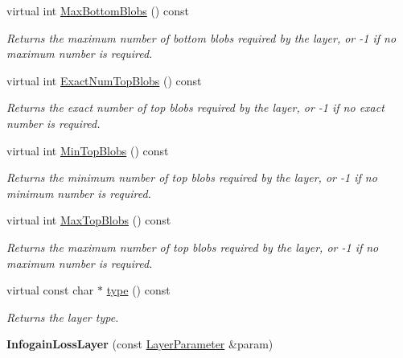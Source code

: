 \begin{DoxyCompactItemize}
virtual int \mbox{\hyperlink{classcaffe_1_1_infogain_loss_layer_a9b2372959a16da1e80ae7a98b7689a4c}{Max\+Bottom\+Blobs}} () const
\begin{DoxyCompactList}\small\item\em Returns the maximum number of bottom blobs required by the layer, or -\/1 if no maximum number is required. \end{DoxyCompactList}\item 
virtual int \mbox{\hyperlink{classcaffe_1_1_infogain_loss_layer_aaf55e75f2296586b1fee0175e2d72fbb}{Exact\+Num\+Top\+Blobs}} () const
\begin{DoxyCompactList}\small\item\em Returns the exact number of top blobs required by the layer, or -\/1 if no exact number is required. \end{DoxyCompactList}\item 
virtual int \mbox{\hyperlink{classcaffe_1_1_infogain_loss_layer_a15c4916e5de27151eb745491d8d14d41}{Min\+Top\+Blobs}} () const
\begin{DoxyCompactList}\small\item\em Returns the minimum number of top blobs required by the layer, or -\/1 if no minimum number is required. \end{DoxyCompactList}\item 
virtual int \mbox{\hyperlink{classcaffe_1_1_infogain_loss_layer_a93019601c6256354fd4758da91d9311f}{Max\+Top\+Blobs}} () const
\begin{DoxyCompactList}\small\item\em Returns the maximum number of top blobs required by the layer, or -\/1 if no maximum number is required. \end{DoxyCompactList}\item 
\mbox{\label{classcaffe_1_1_infogain_loss_layer_aada26ffd60207582fe2af602004e271b}} 
virtual const char $\ast$ \mbox{\hyperlink{classcaffe_1_1_infogain_loss_layer_aada26ffd60207582fe2af602004e271b}{type}} () const
\begin{DoxyCompactList}\small\item\em Returns the layer type. \end{DoxyCompactList}\item 
\mbox{\label{classcaffe_1_1_infogain_loss_layer_ac2269ba8dc7d18fa8fab90ea9f295784}} 
{\bfseries Infogain\+Loss\+Layer} (const \mbox{\hyperlink{classcaffe_1_1_layer_parameter}{Layer\+Parameter}} \&param)

\end{DoxyCompactItemize}
